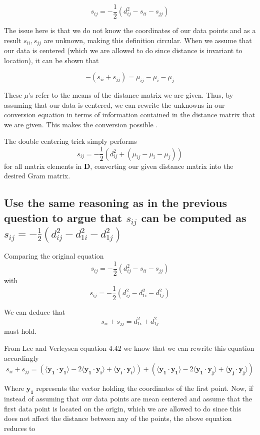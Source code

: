 \documentclass[11pt,a4paper,landscape]{article}
\begin{document}
$$ s_{ij} = -\frac{1}{2}(d^{2}_{ij} - s_{ii} - s_{jj})$$

The issue here is that we do not know the coordinates of our data points and as a result $s_{ii}, s_{jj}$ are unknown, making this definition circular. When we assume that our data is centered (which we are allowed to do since distance is invariant to location), it can be shown that

$$ -(s_{ii} + s_{jj}) = \mu_{ij} - \mu_{i} - \mu_{j} $$

These $\mu$'s refer to the means of the distance matrix we are given. Thus, by assuming that our data is centered, we can rewrite the unknowns in our conversion equation in terms of information contained in the distance matrix that we are given. This makes the conversion possible \cite{book}.

The double centering trick simply performs $$ s_{ij} = -\frac{1}{2}(d^{2}_{ij} +( \mu_{ij} - \mu_{i} - \mu_{j}))$$ for all matrix elements in \textbf{D}, converting our given distance matrix into the desired Gram matrix.


\subsection{Use the same reasoning as in the previous question to argue that $s_{ij}$ can be computed as $s_{ij} = -\frac{1}{2}(d_{ij}^{2} - d_{1i}^{2} - d_{1j}^{2})$}

Comparing the original equation
$$ s_{ij} = -\frac{1}{2}(d^{2}_{ij} - s_{ii} - s_{jj})$$
with
$$s_{ij} = -\frac{1}{2}(d_{ij}^{2} - d_{1i}^{2} - d_{1j}^{2})$$

We can deduce that
$$s_{ii} + s_{jj} = d_{1i}^{2} + d_{1j}^{2}$$
must hold.\newline

From Lee and Verleysen \cite{book} equation 4.42 we know that we can rewrite this equation accordingly
$$ s_{ii} + s_{jj} = (\langle \mathbf{y_{1}} \cdot \mathbf{y_{1}} \rangle - 2\langle \mathbf{y_{1}} \cdot \mathbf{y_{i}} \rangle + \langle \mathbf{y_{i}} \cdot \mathbf{y_{i}} \rangle) + (\langle \mathbf{y_{1}} \cdot \mathbf{y_{1}} \rangle - 2\langle \mathbf{y_{1}} \cdot \mathbf{y_{j}} \rangle + \langle \mathbf{y_{j}} \cdot \mathbf{y_{j}} \rangle)$$

Where $\mathbf{y_{1}}$ represents the vector holding the coordinates of the first point. Now, if instead of assuming that our data points are mean centered and assume that the first data point is located on the origin, which we are allowed to do since this does not affect the distance between any of the points, the above equation reduces to
\end{document}
